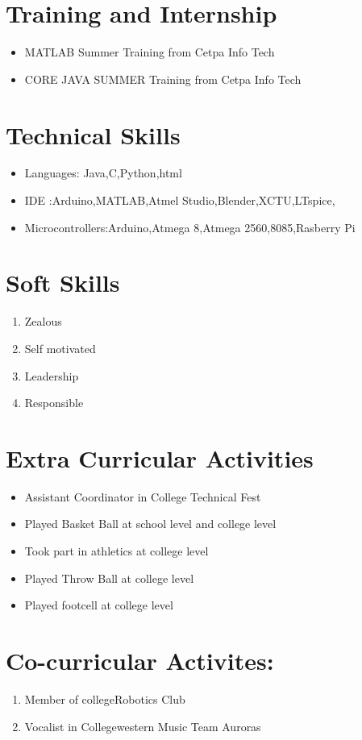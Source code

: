 \documentclass[11pt]{article}
\begin{document}
\section{Training and Internship}
\begin{itemize}
 \item MATLAB Summer Training from Cetpa Info Tech
 \item CORE JAVA SUMMER Training from Cetpa Info Tech
 
\end{itemize}
\newpage
\section{Technical Skills}
\begin{itemize}
\item Languages: Java,C,Python,html
\item IDE :Arduino,MATLAB,Atmel Studio,Blender,XCTU,LTspice,
 \item Microcontrollers:Arduino,Atmega 8,Atmega 2560,8085,Rasberry Pi
 \end{itemize}
\section{Soft Skills}
\begin{enumerate}
\item Zealous
\item Self motivated
\item Leadership
\item Responsible
\end{enumerate}
\section{Extra Curricular Activities}
\begin{itemize}
\item Assistant Coordinator in College Technical Fest
\item Played Basket Ball at school level and college level
\item Took part in athletics at college level
\item Played Throw Ball at college level
\item Played footcell at college level \\
\end{itemize}
\section{Co-curricular Activites:}
\begin{enumerate}
\item Member of college{Robotics Club}
\item Vocalist in College{western Music Team Auroras}
\end{enumerate}
\end{document}
